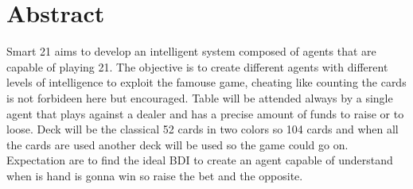 \chapter*{\center \Large  Abstract}

Smart 21 aims to develop an intelligent system composed of agents that are capable of playing 21. The objective is to create different agents with different levels of intelligence to exploit the famouse game, cheating like counting the cards is not forbideen here but encouraged. Table will be attended always by a single agent that plays against a dealer and has a precise amount of funds to raise or to loose. Deck will be the classical 52 cards in two colors so 104 cards and when all the cards are used another deck will be used so the game could go on.
~\\[0.8cm]%
Expectation are to find the ideal BDI to create an agent capable of understand when is hand is gonna win so raise the bet and the opposite. 






